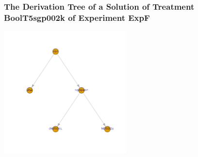  \begin{frame}
 \frametitle{ The Derivation Tree of a Solution of Treatment BoolT5sgp002k of Experiment ExpF }
 \begin{center}
\includegraphics[width=0.5\textwidth, angle=0]
{ExpFDerivationTreeFigure000.pdf}
 \end{center}
 \label{templateReport/ExpFDerivationTreeFigure000.pdf}  
 \end{frame}

